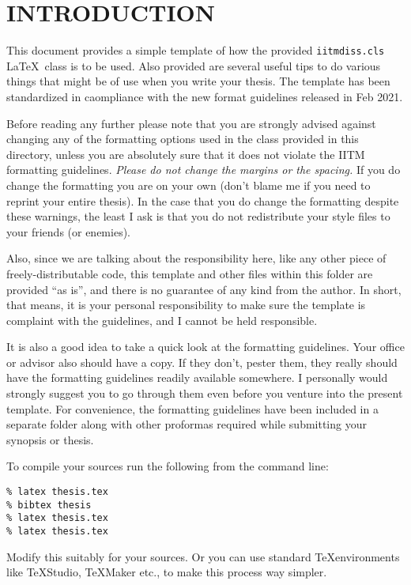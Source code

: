 \chapter{INTRODUCTION}
\label{chap:intro}

This document provides a simple template of how the provided
\verb+iitmdiss.cls+ \LaTeX\ class is to be used.  Also provided are
several useful tips to do various things that might be of use when you
write your thesis. The template has been standardized in caompliance
with the new format guidelines released in Feb 2021. 

Before reading any further please note that you are strongly advised
against changing any of the formatting options used in the class
provided in this directory, unless you are absolutely sure that it
does not violate the IITM formatting guidelines.  \emph{Please do not
  change the margins or the spacing.}  If you do change the formatting
you are on your own (don't blame me if you need to reprint your entire
thesis).  In the case that you do change the formatting despite these
warnings, the least I ask is that you do not redistribute your style
files to your friends (or enemies). 

Also, since we are talking about the responsibility here, 
like any other piece of freely-distributable code, this template
and other files within this folder are provided “as is”, and there is 
no guarantee of any kind from the author. In short, that means, 
it is your personal responsibility to make sure the template is 
complaint with the guidelines, and I cannot be held responsible.


It is also a good idea to take a quick look at the formatting
guidelines.  Your office or advisor also should have a copy.  If they
don't, pester them, they really should have the formatting guidelines
readily available somewhere. I personally would strongly
suggest you to go through them even before you venture into the present
template. For convenience, the formatting guidelines have been included
in a separate folder along with other proformas required while 
submitting your synopsis or thesis.

To compile your sources run the following from the command line:
\begin{verbatim}
% latex thesis.tex
% bibtex thesis
% latex thesis.tex
% latex thesis.tex
\end{verbatim}
Modify this suitably for your sources. Or you can use standard \TeX environments
like \TeX Studio, \TeX Maker etc., to make this process way simpler.

